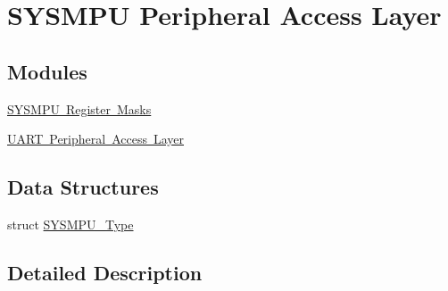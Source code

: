 \hypertarget{group___s_y_s_m_p_u___peripheral___access___layer}{}\section{S\+Y\+S\+M\+PU Peripheral Access Layer}
\label{group___s_y_s_m_p_u___peripheral___access___layer}
\subsection*{Modules}
\begin{DoxyCompactItemize}
\item 
\mbox{\hyperlink{group___s_y_s_m_p_u___register___masks}{S\+Y\+S\+M\+P\+U Register Masks}}
\item 
\mbox{\hyperlink{group___u_a_r_t___peripheral___access___layer}{U\+A\+R\+T Peripheral Access Layer}}
\end{DoxyCompactItemize}
\subsection*{Data Structures}
\begin{DoxyCompactItemize}
\item 
struct \mbox{\hyperlink{struct_s_y_s_m_p_u___type}{S\+Y\+S\+M\+P\+U\+\_\+\+Type}}
\end{DoxyCompactItemize}


\subsection{Detailed Description}

